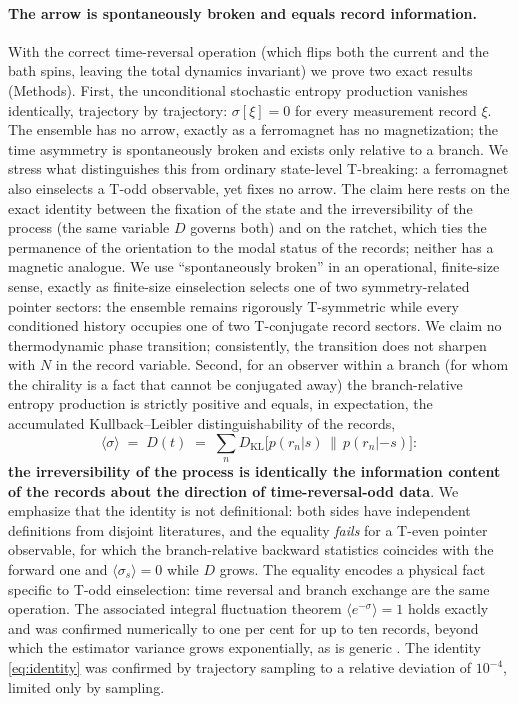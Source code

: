 \documentclass[11pt]{article}
\begin{document}
\paragraph{The arrow is spontaneously broken and equals record information.}
With the correct time-reversal operation (which flips both the current and the bath spins, leaving the total dynamics invariant) we prove two exact results (Methods). First, the unconditional stochastic entropy production vanishes identically, trajectory by trajectory: $\sigma[\xi]=0$ for every measurement record $\xi$. The ensemble has no arrow, exactly as a ferromagnet has no magnetization; the time asymmetry is spontaneously broken and exists only relative to a branch. We stress what distinguishes this from ordinary state-level T-breaking: a ferromagnet also einselects a T-odd observable, yet fixes no arrow. The claim here rests on the exact identity between the fixation of the state and the irreversibility of the process (the same variable $D$ governs both) and on the ratchet, which ties the permanence of the orientation to the modal status of the records; neither has a magnetic analogue. We use ``spontaneously broken'' in an operational, finite-size sense, exactly as finite-size einselection selects one of two symmetry-related pointer sectors: the ensemble remains rigorously T-symmetric while every conditioned history occupies one of two T-conjugate record sectors. We claim no thermodynamic phase transition; consistently, the transition does not sharpen with $N$ in the record variable. Second, for an observer within a branch (for whom the chirality is a fact that cannot be conjugated away) the branch-relative entropy production is strictly positive and equals, in expectation, the accumulated Kullback--Leibler distinguishability of the records,
\begin{equation}
\langle\sigma\rangle \;=\; D(t) \;=\; \sum_n D_{\mathrm{KL}}\!\big[p(r_n|s)\,\big\|\,p(r_n|{-}s)\big]:
\label{eq:identity}
\end{equation}
\textbf{the irreversibility of the process is identically the information content of the records about the direction of time-reversal-odd data}. We emphasize that the identity is not definitional: both sides have independent definitions from disjoint literatures, and the equality \emph{fails} for a T-even pointer observable, for which the branch-relative backward statistics coincides with the forward one and $\langle\sigma_s\rangle=0$ while $D$ grows. The equality encodes a physical fact specific to T-odd einselection: time reversal and branch exchange are the same operation. The associated integral fluctuation theorem $\langle e^{-\sigma}\rangle=1$ holds exactly and was confirmed numerically to one per cent for up to ten records, beyond which the estimator variance grows exponentially, as is generic \cite{Landi2021}. The identity \eqref{eq:identity} was confirmed by trajectory sampling to a relative deviation of $10^{-4}$, limited only by sampling.
\end{document}
